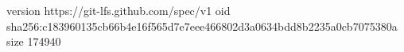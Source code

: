 version https://git-lfs.github.com/spec/v1
oid sha256:c183960135cb66b4e16f565d7e7eee466802d3a0634bdd8b2235a0cb7075380a
size 174940
